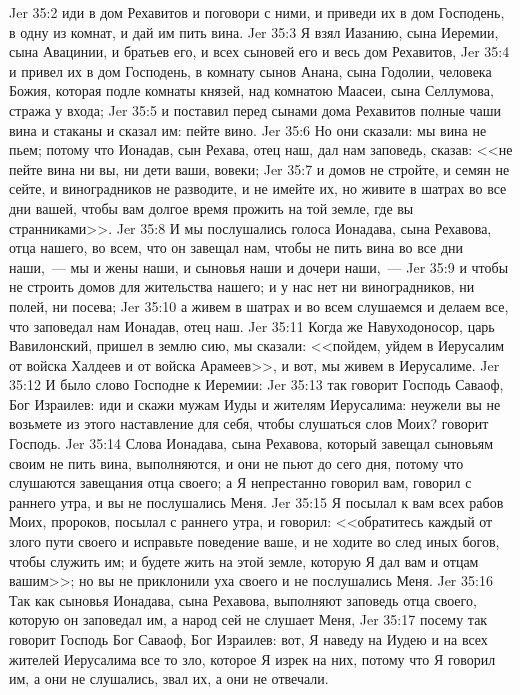 \vs Jer 35:2 иди в дом Рехавитов и поговори с ними, и приведи их в дом Господень, в одну из комнат, и дай им пить вина.
\vs Jer 35:3 Я взял Иазанию, сына Иеремии, сына Авацинии, и братьев его, и всех сыновей его и весь дом Рехавитов,
\vs Jer 35:4 и привел их в дом Господень, в комнату сынов Анана, сына Годолии, человека Божия, которая подле комнаты князей, над комнатою Маасеи, сына Селлумова, стража у входа;
\vs Jer 35:5 и поставил перед сынами дома Рехавитов полные чаши вина и стаканы и сказал им: пейте вино.
\vs Jer 35:6 Но они сказали: мы вина не пьем; потому что Ионадав, сын Рехава, отец наш, дал нам заповедь, сказав: <<не пейте вина ни вы, ни дети ваши, вовеки;
\vs Jer 35:7 и домов не стройте, и семян не сейте, и виноградников не разводите, и не имейте их, но живите в шатрах во все дни  вашей, чтобы вам долгое время прожить на той земле, где вы странниками>>.
\vs Jer 35:8 И мы послушались голоса Ионадава, сына Рехавова, отца нашего, во всем, что он завещал нам, чтобы не пить вина во все дни наши,~--- мы и жены наши, и сыновья наши и дочери наши,~---
\vs Jer 35:9 и чтобы не строить домов для жительства нашего; и у нас нет ни виноградников, ни полей, ни посева;
\vs Jer 35:10 а живем в шатрах и во всем слушаемся и делаем все, что заповедал нам Ионадав, отец наш.
\vs Jer 35:11 Когда же Навуходоносор, царь Вавилонский, пришел в землю сию, мы сказали: <<пойдем, уйдем в Иерусалим от войска Халдеев и от войска Арамеев>>, и вот, мы живем в Иерусалиме.
\rsbpar\vs Jer 35:12 И было слово Господне к Иеремии:
\vs Jer 35:13 так говорит Господь Саваоф, Бог Израилев: иди и скажи мужам Иуды и жителям Иерусалима: неужели вы не возьмете из этого наставление для себя, чтобы слушаться слов Моих? говорит Господь.
\vs Jer 35:14 Слова Ионадава, сына Рехавова, который завещал сыновьям своим не пить вина, выполняются, и они не пьют до сего дня, потому что слушаются завещания отца своего; а Я непрестанно говорил вам, говорил с раннего утра, и вы не послушались Меня.
\vs Jer 35:15 Я посылал к вам всех рабов Моих, пророков, посылал с раннего утра, и говорил: <<обратитесь каждый от злого пути своего и исправьте поведение ваше, и не ходите во след иных богов, чтобы служить им; и будете жить на этой земле, которую Я дал вам и отцам вашим>>; но вы не приклонили уха своего и не послушались Меня.
\vs Jer 35:16 Так как сыновья Ионадава, сына Рехавова, выполняют заповедь отца своего, которую он заповедал им, а народ сей не слушает Меня,
\vs Jer 35:17 посему так говорит Господь Бог Саваоф, Бог Израилев: вот, Я наведу на Иудею и на всех жителей Иерусалима все то зло, которое Я изрек на них, потому что Я говорил им, а они не слушались, звал их, а они не отвечали.
